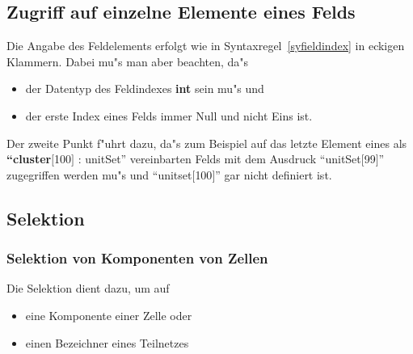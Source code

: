 \subsection{Zugriff auf einzelne Elemente eines Felds}

Die Angabe des Feldelements erfolgt wie
in Syntaxregel~\ref{syfieldindex} in eckigen Klammern. Dabei mu"s man
aber beachten, da"s

\begin{itemize}
  \item der Datentyp des Feldindexes {\bf int} sein mu"s und
  \item der erste Index eines Felds immer Null und nicht Eins ist.
\end{itemize}

Der zweite Punkt f"uhrt dazu, da"s zum Beispiel auf das letzte Element
eines als {\bf ``cluster}$[$100$]$ : unitSet'' vereinbarten Felds mit
dem Ausdruck ``unitSet$[$99$]$'' zugegriffen werden mu"s und
``unitset$[$100$]$'' gar nicht definiert ist.

\begin{center}
\end{center}


\subsection{Selektion}
\label{Selektion}

\subsubsection{Selektion von Komponenten von Zellen}

Die Selektion dient dazu, um auf

\begin{itemize} 
  \item eine Komponente einer Zelle oder
  \item einen Bezeichner eines Teilnetzes 
\end{itemize}

